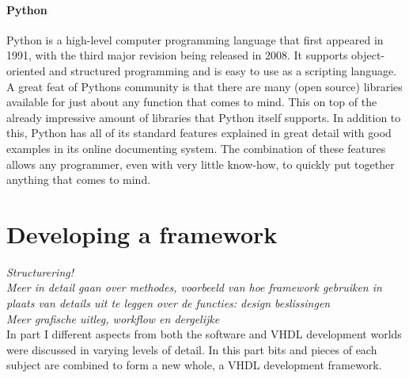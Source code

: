 \documentclass[11pt,british]{article}
\begin{document}

\subsection{Python}
Python is a high-level computer programming language that first appeared in 1991, with the third major revision being released in 2008. It supports object-oriented and structured programming and is easy to use as a scripting language. A great feat of Pythons community is that there are many (open source) libraries available for just about any function that comes to mind. This on top of the already impressive amount of libraries that Python itself supports. In addition to this, Python has all of its standard features explained in great detail with good examples in its online documenting system. The combination of these features allows any programmer, even with very little know-how, to quickly put together anything that comes to mind.


\newpage
\part{Developing a framework}
\emph{\color{red}Structurering!}\\
\emph{\color{red}Meer in detail gaan over methodes, voorbeeld van hoe framework gebruiken in plaats van details uit te leggen over de functies: design beslissingen}\\
\emph{\color{red}Meer grafische uitleg, workflow en dergelijke}\\
In part I different aspects from both the software and \gls{VHDL} development worlds were discussed in  varying levels of detail. In this part bits and pieces of each subject are combined to form a new whole, a VHDL development framework.
\end{document}
